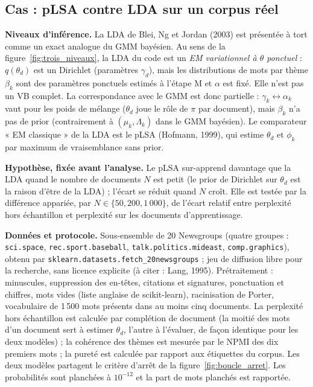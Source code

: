\subsection{Cas : pLSA contre LDA sur un corpus réel}
\textbf{Niveaux d'inférence. }La LDA de Blei, Ng et Jordan (2003) est présentée à tort comme un exact analogue du GMM bayésien. Au sens de la figure~\ref{fig:trois_niveaux}, la LDA du code est un \emph{EM variationnel à $\theta$ ponctuel} : $q(\theta_d)$ est un Dirichlet (paramètres $\gamma_d$), mais les distributions de mots par thème $\beta_k$ sont des paramètres ponctuels estimés à l'étape M et $\alpha$ est fixé. Elle n'est pas un VB complet. La correspondance avec le GMM est donc partielle : $\gamma_k \leftrightarrow \alpha_k$ vaut pour les poids de mélange ($\theta_d$ joue le rôle de $\pi$ par document), mais $\beta_k$ n'a pas de prior (contrairement à $(\mu_k,\Lambda_k)$ dans le GMM bayésien). Le comparateur « EM classique » de la LDA est le pLSA (Hofmann, 1999), qui estime $\theta_d$ et $\phi_k$ par maximum de vraisemblance sans prior.



\textbf{Hypothèse, fixée avant l'analyse. }Le pLSA sur-apprend davantage que la LDA quand le nombre de documents $N$ est petit (le prior de Dirichlet sur $\theta_d$ est la raison d'être de la LDA) ; l'écart se réduit quand $N$ croît. Elle est testée par la différence appariée, par $N \in \{50, 200, 1\,000\}$, de l'écart relatif entre perplexité hors échantillon et perplexité sur les documents d'apprentissage.

\textbf{Données et protocole. }Sous-ensemble de 20 Newsgroups (quatre groupes : \texttt{sci.space}, \texttt{rec.sport.baseball}, \texttt{talk.politics.mideast}, \texttt{comp.graphics}), obtenu par \texttt{sklearn.datasets.fetch\_20newsgroups} ; jeu de diffusion libre pour la recherche, sans licence explicite (à citer : Lang, 1995). Prétraitement : minuscules, suppression des en-têtes, citations et signatures, ponctuation et chiffres, mots vides (liste anglaise de scikit-learn), racinisation de Porter, vocabulaire de 1\,500 mots présents dans au moins cinq documents. La perplexité hors échantillon est calculée par complétion de document (la moitié des mots d'un document sert à estimer $\theta_d$, l'autre à l'évaluer, de façon identique pour les deux modèles) ; la cohérence des thèmes est mesurée par le NPMI des dix premiers mots ; la pureté est calculée par rapport aux étiquettes du corpus. Les deux modèles partagent le critère d'arrêt de la figure~\ref{fig:boucle_arret}. Les probabilités sont planchées à $10^{-12}$ et la part de mots planchés est rapportée.

